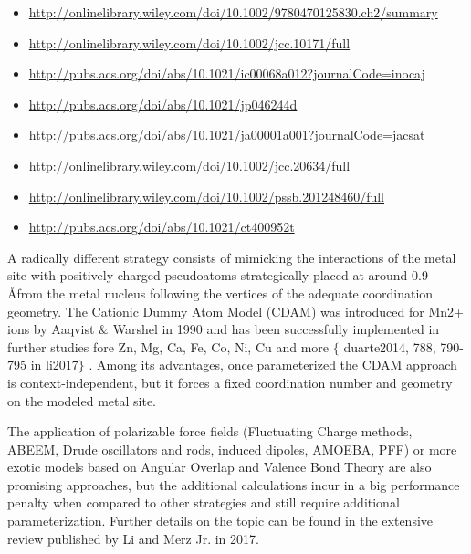 \begin{itemize}
	\item \href{http://onlinelibrary.wiley.com/doi/10.1002/9780470125830.ch2/summary}{http://onlinelibrary.wiley.com/doi/10.1002/9780470125830.ch2/summary}

	\item \href{http://onlinelibrary.wiley.com/doi/10.1002/jcc.10171/full}{http://onlinelibrary.wiley.com/doi/10.1002/jcc.10171/full}

	\item \href{http://pubs.acs.org/doi/abs/10.1021/ic00068a012?journalCode=inocaj}{http://pubs.acs.org/doi/abs/10.1021/ic00068a012?journalCode=inocaj}

	\item \href{http://pubs.acs.org/doi/abs/10.1021/jp046244d}{http://pubs.acs.org/doi/abs/10.1021/jp046244d}

	\item \href{http://pubs.acs.org/doi/abs/10.1021/ja00001a001?journalCode=jacsat}{http://pubs.acs.org/doi/abs/10.1021/ja00001a001?journalCode=jacsat}

	\item \href{http://onlinelibrary.wiley.com/doi/10.1002/jcc.20634/full}{http://onlinelibrary.wiley.com/doi/10.1002/jcc.20634/full}

	\item \href{http://onlinelibrary.wiley.com/doi/10.1002/pssb.201248460/full}{http://onlinelibrary.wiley.com/doi/10.1002/pssb.201248460/full}

	\item \href{http://pubs.acs.org/doi/abs/10.1021/ct400952t}{http://pubs.acs.org/doi/abs/10.1021/ct400952t}
\end{itemize}

A radically different strategy consists of mimicking the interactions of the metal site with positively-charged pseudoatoms strategically placed at around 0.9 \AA from the metal nucleus following the vertices of the adequate coordination geometry. The Cationic Dummy Atom Model (CDAM) was introduced for Mn2+ ions by Aaqvist $\&$  Warshel in 1990\cite{aaqvist1990} and has been successfully implemented in further studies fore Zn, Mg, Ca, Fe, Co, Ni, Cu and more $ \{ $ duarte2014, 788, 790-795 in li2017$ \} $ . Among its advantages, once parameterized the CDAM approach is context-independent, but it forces a fixed coordination number and geometry on the modeled metal site.

The application of polarizable force fields (Fluctuating Charge methods, ABEEM, Drude oscillators and rods, induced dipoles, AMOEBA, PFF) or more exotic models based on Angular Overlap and Valence Bond Theory are also promising approaches, but the additional calculations incur in a big performance penalty when compared to other strategies and still require additional parameterization. Further details on the topic can be found in the extensive review published by Li and Merz Jr. in 2017.\cite{li2017}

